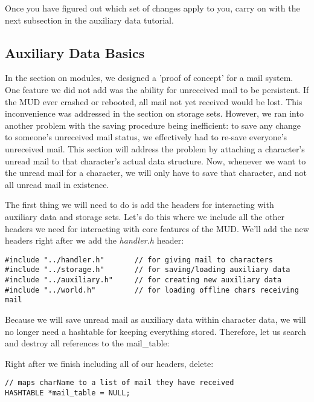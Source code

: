 \documentclass[12pt]{article}
\begin{document}
Once you have figured out which set of changes apply to you, carry on with the next subsection in the auxiliary data tutorial.



\subsection{Auxiliary Data Basics}
In the section on modules, we designed a 'proof of concept' for a mail system. One feature we did not add was the ability for unreceived mail to be persistent. If the MUD ever crashed or rebooted, all mail not yet received would be lost. This inconvenience was addressed in the section on storage sets. However, we ran into another problem with the saving procedure being inefficient: to save any change to someone's unreceived mail status, we effectively had to re-save everyone's unreceived mail. This section will address the problem by attaching a character's unread mail to that character's actual data structure. Now, whenever we want to the unread mail for a character, we will only have to save that character, and not all unread mail in existence.

The first thing we will need to do is add the headers for interacting with auxiliary data and storage sets. Let's do this where we include all the other headers we need for interacting with core features of the MUD. We'll add the new headers right after we add the {\it handler.h} header:

{\bf \begin{verbatim}
#include "../handler.h"       // for giving mail to characters
#include "../storage.h"       // for saving/loading auxiliary data
#include "../auxiliary.h"     // for creating new auxiliary data
#include "../world.h"         // for loading offline chars receiving mail
\end{verbatim}}

Because we will save unread mail as auxiliary data within character data, we will no longer need a hashtable for keeping everything stored. Therefore, let us search and destroy all references to the mail\_table:

Right after we finish including all of our headers, delete:
{\bf \begin{verbatim}
// maps charName to a list of mail they have received
HASHTABLE *mail_table = NULL;
\end{verbatim}}
\end{document}
